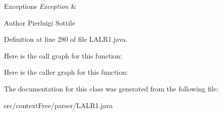 \begin{DoxyExceptions}{Exceptions}
{\em Exception} & \\
\hline
\end{DoxyExceptions}
\begin{DoxyAuthor}{Author}
Pierluigi Sottile 
\end{DoxyAuthor}


Definition at line 280 of file L\-A\-L\-R1.\-java.



Here is the call graph for this function\-:




Here is the caller graph for this function\-:




The documentation for this class was generated from the following file\-:\begin{DoxyCompactItemize}
\item 
src/context\-Free/parser/L\-A\-L\-R1.\-java\end{DoxyCompactItemize}
